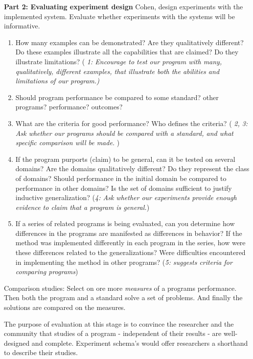 \textbf{Part 2: Evaluating experiment design}
Cohen, design experiments with the implemented system. 
Evaluate whether experiments with the systems will be informative. 
\begin{enumerate}
\item How many examples can be demonstrated? Are they qualitatively different? Do these examples illustrate all the capabilities that are claimed? Do they illustrate limitations? ( \textit{1: Encourage to test our program with many, qualitatively, different examples, that illustrate both the abilities and limitations of our program.) }
\item Should program performance be compared to some standard? other programs? performance? outcomes?
\item What are the criteria for good performance? Who defines the criteria? (\textit{ 2, 3: Ask whether our programs should be compared with a standard, and what specific comparison will be made. })
\item If the program purports (claim) to be general, can it be tested on several domains? Are the domains qualitatively different? Do they represent the class of domains? Should performance in the initial domain be compared to performance in other domains? Is the set of domains sufficient to justify inductive generalization? (\textit{4: Ask whether our experiments provide enough evidence to claim that a program is general.})
\item If a series of related programs is being evaluated, can you determine how differences in the programs are manifested as differences in behavior? If the method was implemented differently in each program in the series, how were these differences related to the generalizations? Were difficulties encountered in implementing the method in other programs? (\textit{5: suggests criteria for comparing programs})
\end{enumerate}

Comparison studies: Select on ore more \textit{measures} of a programs performance. Then both the program and a standard solve a set of problems. And finally the solutions are compared on the measures. 

The purpose of evaluation at this stage is to convince the researcher and the community that studies of a program - independent of their results - are well-designed and complete. Experiment schema's would offer researchers a shorthand to describe their studies.
